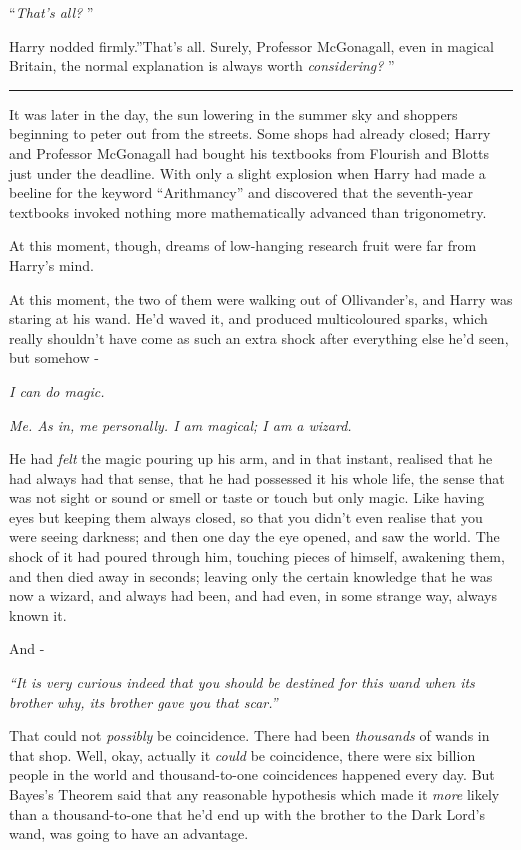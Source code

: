 ``\emph{That's all?} ''

Harry nodded firmly.''That's all. Surely, Professor McGonagall, even in
magical Britain, the normal explanation is always worth
\emph{considering?} ''

\begin{center}\rule{3in}{0.4pt}\end{center}

It was later in the day, the sun lowering in the summer sky and shoppers
beginning to peter out from the streets. Some shops had already closed;
Harry and Professor McGonagall had bought his textbooks from Flourish
and Blotts just under the deadline. With only a slight explosion when
Harry had made a beeline for the keyword ``Arithmancy'' and discovered
that the seventh-year textbooks invoked nothing more mathematically
advanced than trigonometry.

At this moment, though, dreams of low-hanging research fruit were far
from Harry's mind.

At this moment, the two of them were walking out of Ollivander's, and
Harry was staring at his wand. He'd waved it, and produced multicoloured
sparks, which really shouldn't have come as such an extra shock after
everything else he'd seen, but somehow -

\emph{I can do magic.}

\emph{Me. As in, me personally. I am magical; I am a wizard.}

He had \emph{felt} the magic pouring up his arm, and in that instant,
realised that he had always had that sense, that he had possessed it his
whole life, the sense that was not sight or sound or smell or taste or
touch but only magic. Like having eyes but keeping them always closed,
so that you didn't even realise that you were seeing darkness; and then
one day the eye opened, and saw the world. The shock of it had poured
through him, touching pieces of himself, awakening them, and then died
away in seconds; leaving only the certain knowledge that he was now a
wizard, and always had been, and had even, in some strange way, always
known it.

And -

\emph{``It is very curious indeed that you should be destined for this
wand when its brother why, its brother gave you that scar.''}

That could not \emph{possibly} be coincidence. There had been
\emph{thousands} of wands in that shop. Well, okay, actually it
\emph{could} be coincidence, there were six billion people in the world
and thousand-to-one coincidences happened every day. But Bayes's Theorem
said that any reasonable hypothesis which made it \emph{more} likely
than a thousand-to-one that he'd end up with the brother to the Dark
Lord's wand, was going to have an advantage.

